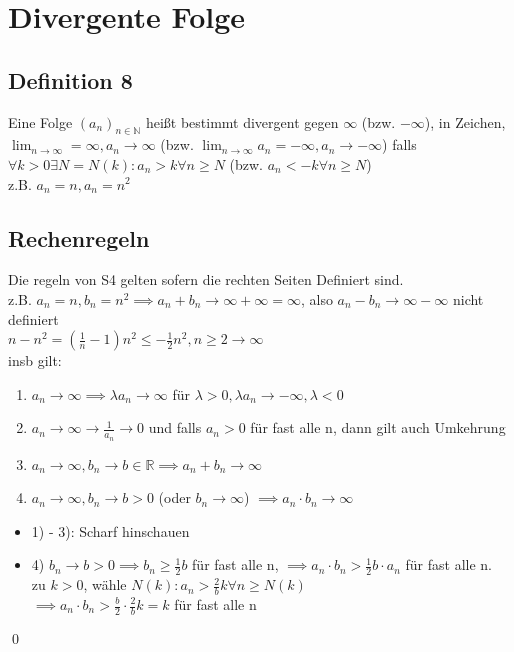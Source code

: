 \documentclass[fleqn]{scrbook}
\renewenvironment{proof}{{\bfseries Beweis }}{\qed}
\begin{document}
\section{Divergente Folge}
\subsection{Definition 8} Eine Folge $(a_n)_{n \in \mathbb{N}}$ heißt bestimmt divergent gegen $\infty$ (bzw. $-\infty$), in Zeichen, $\lim_{n\rightarrow \infty} = \infty, a_n \rightarrow \infty$ (bzw. $\lim_{n\rightarrow\infty} a_n = - \infty , a_n \rightarrow - \infty$) falls $\forall k > 0 \exists N = N(k): a_n > k \forall n \geq N$ (bzw. $a_n < -k \forall n \geq N$)\\
z.B. $a_n = n, a_n = n^2$
\subsection{Rechenregeln} Die regeln von S4 gelten sofern die rechten Seiten Definiert sind.\\
z.B. $a_n = n, b_n = n^2 \implies a_n + b_n \rightarrow \infty + \infty = \infty$, also $a_n - b_n \rightarrow \infty - \infty$ nicht definiert\\
$n - n^2 = (\frac{1}{n} - 1) n^2 \leq -\frac{1}{2}n^2, n\geq 2 \rightarrow \infty$\\
insb gilt:
\begin{enumerate}[1)]
\item $a_n \rightarrow \infty \implies \lambda a_n \rightarrow \infty$ für $\lambda > 0, \lambda a_n \rightarrow - \infty, \lambda < 0$
\item $a_n \rightarrow \infty \rightarrow \frac{1}{a_n} \rightarrow 0$ und falls $a_n > 0$ für fast alle n, dann gilt auch Umkehrung
\item $a_n \rightarrow \infty, b_n \rightarrow b \in \mathbb{R} \implies a_n + b_n \rightarrow \infty$
\item $a_n \rightarrow \infty, b_n \rightarrow b > 0$ (oder $b_n \rightarrow \infty$) $\implies a_n  \cdot  b_n \rightarrow \infty$
\end{enumerate}
\begin{proof}
\begin{itemize}
\item 1) - 3): Scharf hinschauen
\item 4) $b_n \rightarrow b > 0 \implies b_n \geq \frac{1}{2} b$ für fast alle n, $\implies a_n  \cdot  b_n > \frac{1}{2}b \cdot a_n$ für fast alle n.\\zu $k > 0$, wähle $N(k): a_n > \frac{2}{b}k \forall n\geq N(k)$\\$\implies a_n  \cdot  b_n > \frac{b}{2}  \cdot  \frac{2}{b} k = k$ für fast alle n
\end{itemize}
\end{proof}
\end{document}
